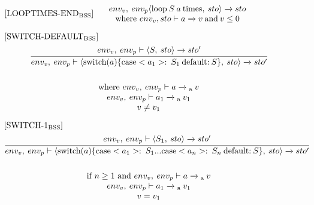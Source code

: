 \begin{equation}
\begin{minipage}{.2\linewidth}
$[\text{LOOPTIMES-END}_\text{BSS}]$
\end{minipage}
\begin{minipage}{.8\linewidth}
\centering
$env_v, \: env_p \langle \text{loop} \: S \: a \: \text{times}, \: sto \rangle \xrightarrow{} sto$ 
\\
where $env_v, sto \vdash a \xrightarrow{} v \: \text{and} \: v \leq 0$
\end{minipage}
\end{equation}

\begin{equation}
\begin{split}
\begin{minipage}{\linewidth}
$[\text{SWITCH-DEFAULT}_\text{BSS}]$
\end{minipage}
\\
\begin{minipage}{\linewidth}
\centering
$\cfrac{env_v, \: env_p \vdash \langle S, \: sto \rangle \xrightarrow{} sto'}{env_v, \: env_p \vdash \langle \text{switch}(a) \{\text{case} <a_1>: \: S_1  \: \text{default:} \: S\}, \: sto \rangle \xrightarrow{} sto' }$ 
\end{minipage}
\\\\
\begin{minipage}{\linewidth}
\centering
where $env_v, \: env_p \vdash a \xrightarrow{}\textsubscript{a} \: v$
\\
$env_v, \: env_p \vdash a_1 \xrightarrow{}\textsubscript{a} \: v_1$
\\
$v \neq v_1$
\end{minipage}
\end{split}
\end{equation}

\begin{equation}
\begin{split}
\begin{minipage}{\linewidth}
$[\text{SWITCH-1}_\text{BSS}]$
\end{minipage}
\\
\begin{minipage}{\linewidth}
\centering
$\cfrac
{
    env_v, \: env_p \vdash \langle S_1, \: sto \rangle \xrightarrow{} sto'
}
{
   env_v, \: env_p \vdash \langle \text{switch}(a) \{\text{case} <a_1>: \: S_1 ... \text{case} <a_n>: \: S_n \: \text{default:} \: S\}, \: sto \rangle \xrightarrow{} sto' 
}
$ 
\end{minipage}
\\\\
\begin{minipage}{\linewidth}
\centering
if $ n \geq 1$ and $env_v, \: env_p \vdash a \xrightarrow{}\textsubscript{a} \: v$
\\
$env_v, \: env_p \vdash a_1 \xrightarrow{}\textsubscript{a} \: v_1$
\\
$v = v_1$
\end{minipage}
\end{split}
\end{equation}


